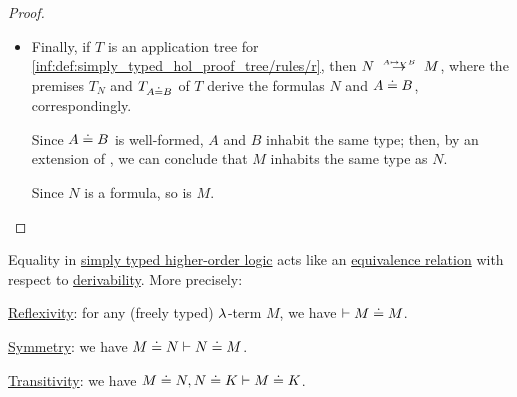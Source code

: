 \begin{proof}
\begin{itemize}
    \item Finally, if \( T \) is an application tree for \ref{inf:def:simply_typed_hol_proof_tree/rules/r}, then \( N \redrel{A \mapsto_V B} M \), where the premises \( T_N \) and \( T_{A \doteq B} \) of \( T \) derive the formulas \( N \) and \( A \doteq B \), correspondingly.

    Since \( A \doteq B \) is well-formed, \( A \) and \( B \) inhabit the same type; then, by an extension of , we can conclude that \( M \) inhabits the same type as \( N \).

    Since \( N \) is a formula, so is \( M \).
  \end{itemize}
\end{proof}

\begin{proposition}\label{thm:simply_typed_hol_equality}
  Equality in \hyperref[def:simply_typed_hol]{simply typed higher-order logic} acts like an \hyperref[def:equivalence_relation]{equivalence relation} with respect to \hyperref[def:simply_typed_hol_proof_tree]{derivability}. More precisely:

  \begin{thmenum}
     \hyperref[def:relation_closures/reflexive]{Reflexivity}: for any (freely typed) \( {\mathrm \lambda} \)-term \( M \), we have \( \vdash M \doteq M \).

     \hyperref[def:relation_closures/symmetric]{Symmetry}: we have \( M \doteq N \vdash N \doteq M \).

     \hyperref[def:relation_closures/transitive]{Transitivity}: we have \( M \doteq N, N \doteq K \vdash M \doteq K \).
  \end{thmenum}
\end{proposition}
